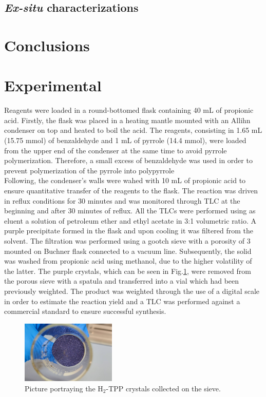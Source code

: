 \documentclass[num-refs]{wiley-article}
\begin{document}
\subsection{\textit{Ex-situ} characterizations}

\section{Conclusions}
\section{Experimental}
Reagents were loaded in a round-bottomed flask containing 40 mL of propionic acid.
Firstly, the flask was placed in a heating mantle mounted with an Allihn condenser on top and heated to boil the acid.
The reagents, consisting in 1.65 mL (15.75 mmol) of benzaldehyde and 1 mL of pyrrole (14.4 mmol), were loaded from the upper end of the condenser at the same time to avoid pyrrole polymerization.
Therefore, a small excess of benzaldehyde was used in order to prevent polymerization of the pyrrole into polypyrrole \\
Following, the condenser's walls were wahed with 10 mL of propionic acid to ensure quantitative transfer of the reagents to the flask.
The reaction was driven in reflux conditions for 30 minutes and was monitored through TLC at the beginning and after 30 minutes of reflux.
All the TLCs were performed using as eluent a solution of petroleum ether and ethyl acetate in 3:1 volumetric ratio.
A purple precipitate formed in the flask and upon cooling it was filtered from the solvent.
The filtration was performed using a gootch sieve with a porosity of 3 mounted on Buchner flask connected to a vacuum line.
Subsequently, the solid was washed from propionic acid using methanol, due to the higher volatility of the latter.
The purple crystals, which can be seen in Fig.\ref{pic-tpp}, were removed from the porous sieve with a spatula and transferred into a vial which had been previously weighted.
The product was weighted through the use of a digital scale in order to estimate the reaction yield and a TLC was performed against a commercial standard to ensure successful synthesis.\\
\begin{figure}[h]
    \centering
    \includegraphics[width=0.4\textwidth]{photo-tpp}
    \caption{Picture portraying the H$_{2}$-TPP crystals collected on the sieve.}
    \label{pic-tpp}
\end{figure}
\end{document}
